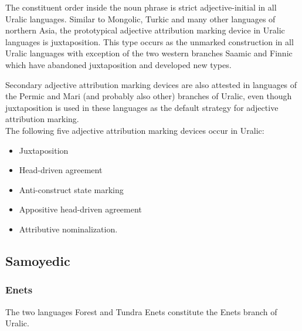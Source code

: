 \noindent The constituent order inside the noun phrase is strict adjective-initial in all Uralic languages. Similar to Mongolic, Turkic and many other languages of northern Asia, the prototypical adjective attribution marking device in Uralic languages is juxtaposition. This type occurs as the unmarked construction in all Uralic languages with exception of the two western branches Saamic and Finnic which have abandoned juxtaposition and developed new types.

Secondary adjective attribution marking devices are also attested in languages of the Permic and Mari (and probably also other) branches of Uralic, even though juxtaposition is used in these languages as the default strategy for adjective attribution marking.\\

\noindent The following five adjective attribution marking devices occur in Uralic:
\begin{itemize}
\item Juxtaposition
\item Head-driven agreement
\item Anti-construct state marking
\item Appositive head-driven agreement
\item Attributive nominalization.
\end{itemize}

\subsection{Samoyedic}
\subsubsection{Enets}
The two languages Forest and Tundra Enets constitute the Enets branch of Uralic.

